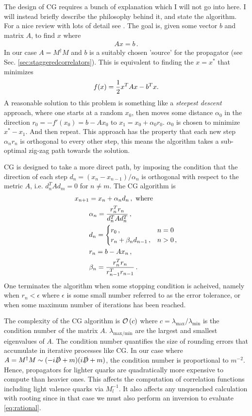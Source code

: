 The design of CG requires a bunch of explanation which I will not go into here. I will instead briefly describe the philosophy behind it, and state the algorithm. For a nice review with lots of detail see \cite{Shewchuk94anintroduction}. The goal is, given some vector $b$ and matrix $A$, to find $x$ where
\begin{align}
  Ax = b\,.
\end{align}
In our case $A=M^{\dagger}M$ and $b$ is a suitably chosen 'source' for the propagator (see Sec. \ref{sec:staggeredcorrelators}). This is equivalent to finding the $x=x^*$ that minimizes
\begin{align}
  f(x) = {1\over2}x^TAx - b^Tx.
\end{align}
A reasonable solution to this problem is something like a {\it{steepest descent}} approach, where one starts at a random $x_0$, then moves some distance $\alpha_0$ in the direction $r_0 = -f'(x_0) = b-Ax_0$ to $x_1=x_0+\alpha_0 r_0$. $\alpha_0$ is chosen to minimize $x^*-x_1$. And then repeat. This approach has the property that each new step $\alpha_n r_n$ is orthogonal to every other step, this means the algorithm takes a sub-optimal zig-zag path towards the solution.

CG is designed to take a more direct path, by imposing the condition that the direction of each step $d_n=(x_n-x_{n-1})/\alpha_n$ is orthogonal with respect to the metric $A$, i.e. $d^T_n A d_m = 0$ for $n\neq m$. The CG algorithm is
\begin{align}
  \nonumber
  x_{n+1} &= x_n + \alpha_n d_n\,, \text{ where } \\
  \nonumber
  &\alpha_n = {r^T_n r_n \over d^T_n A d_n^T}\,, \\
  \nonumber
  &d_n=
  \begin{cases}
    r_0\,, &  n=0 \\
    r_{n} + \beta_n d_{n-1}\,, & n>0\,,
  \end{cases} \\
  \nonumber
  &r_n = b - Ax_n\,, \\
  &\beta_n = {r^T_n r_n \over r^T_{n-1}r_{n-1}}\,.
  \label{eq:CG}
\end{align}
One terminates the algorithm when some stopping condition is acheived, namely when $r_n < \epsilon$ where $\epsilon$ is some small number referred to as the error tolerance, or when some maximum number of iterations has been reached.

The complexity of the CG algorithm is $\mathcal{O}\left( c \right)$ where $c=\lambda_{\text{max}}/\lambda_{\text{min}}$ is the condition number of the matrix $A$. $\lambda_{\text{max/min}}$ are the largest and smallest eigenvalues of $A$. The condition number quantifies the size of rounding errors that accumulate in iterative processes like CG. In our case where $A=M^{\dagger}M  \sim(-i\slashed{D}+m)(i\slashed{D}+m)$, the condition number is proportional to $m^{-2}$. Hence, propagators for lighter quarks are quadratically more expensive to compute than heavier ones. This affects the computation of correlation functions including light valence quarks via $M_l^{-1}$. It also affects any unquenched calculation with rooting since in that case we must also perform an inversion to evaluate \eqref{eq:rational}.

